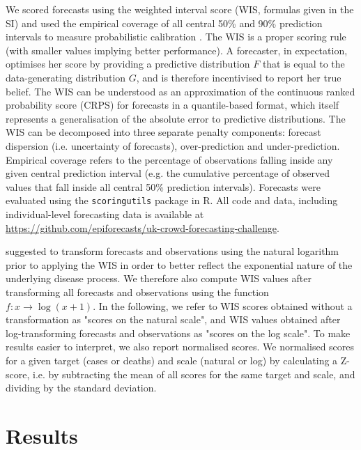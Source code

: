 \documentclass[10pt,a4paper,twocolumn]{article}
\begin{document}
We scored forecasts using the weighted interval score (WIS, formulas given in the SI) %
\cite{bracherEvaluatingEpidemicForecasts2021} and used the empirical coverage of all central 50\% and 90\% prediction intervals to measure probabilistic calibration \citep{gneitingProbabilisticForecastsCalibration2007}. The WIS is a proper scoring rule (with smaller values implying better performance). A forecaster, in expectation, optimises her score by providing a predictive distribution $F$ that is equal to the data-generating distribution $G$, and is therefore incentivised to report her true belief. The WIS can be understood as an approximation of the continuous ranked probability score (CRPS) for forecasts in a quantile-based format, which itself represents a generalisation of the absolute error to predictive distributions. The WIS can be decomposed into three separate penalty components: forecast dispersion (i.e. uncertainty of forecasts), over-prediction and under-prediction. Empirical coverage refers to the percentage of observations falling inside any given central prediction interval (e.g. the cumulative percentage of observed values that fall inside all central 50\% prediction intervals). Forecasts were evaluated using the \texttt{scoringutils} \citep{bosseEvaluatingForecastsScoringutils2022} package in \textsf{R}. All code and data, including individual-level forecasting data is available at \url{https://github.com/epiforecasts/uk-crowd-forecasting-challenge}. 

\citet{bosseTransformationForecastsEvaluating2023} suggested to transform forecasts and observations using the natural logarithm prior to applying the WIS in order to better reflect the exponential nature of the underlying disease process. We therefore also compute WIS values after transforming all forecasts and observations using the function $f\colon x \to \log (x + 1)$. In the following, we refer to WIS scores obtained without a transformation as "scores on the natural scale", and WIS values obtained after log-transforming forecasts and observations as "scores on the log scale". To make results easier to interpret, we also report normalised scores. We normalised scores for a given target (cases or deaths) and scale (natural or log) by calculating a Z-score, i.e. by subtracting the mean of all scores for the same target and scale, and dividing by the standard deviation. 

\section*{Results}
\end{document}
